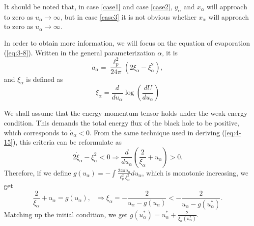 \documentclass[letterpaper,12pt]{article}
\begin{document}
It should be noted that, in case \ref{case1} and case \ref{case2}, $y_{\alpha}$ and $x_{\alpha}$ will approach to zero as $u_{\alpha} \rightarrow \infty$, but in case \ref{case3} it is not obvious whether $x_{\alpha}$ will approach to zero as $u_{\alpha} \rightarrow \infty$. 

In order to obtain more information, we will focus on the equation of evaporation (\ref{eq:3-8}). Written in the general parameterization $\alpha$, it is
\begin{equation}\label{eq:4-16}
\dot{a}_{\alpha} = \frac{\ell_{p}^{2}}{24\pi}(2\dot{\xi}_{\alpha}-\xi_{\alpha}^{2}),
\end{equation}
and $\xi_{\alpha}$ is defined as 
\begin{equation}\label{eq:4-18}
\xi_{\alpha} = \frac{d}{du_{\alpha}}\log\left(\frac{dU}{du_{\alpha}}\right)  
\end{equation}

We shall assume that the energy momentum tensor holds under the weak energy condition. This demands the total energy flux of the black hole to be positive, which corresponds to $\dot{a}_{\alpha} < 0$. From the same technique used in deriving (\ref{eq:4-15}), this criteria can be reformulate as 
\begin{equation}
2\dot{\xi}_{\alpha}-\xi_{\alpha}^{2} < 0 \Rightarrow \frac{d}{du_{\alpha}}\left( \frac{2}{\xi_{\alpha}} + u_{\alpha} \right) > 0.
\end{equation}
Therefore, if we define $g(u_{\alpha}) = -\int \frac{ 24\pi\dot{a}_{\alpha}}{\ell_{p}^{2}\xi_{\alpha}^{2}} du_{\alpha}$, which is monotonic increasing, we get
\begin{equation}
\frac{2}{\xi_{\alpha}} + u_{\alpha} = g(u_{\alpha}), \textrm{ }\Rightarrow \xi_{\alpha} = -\frac{2}{u_{\alpha}- g(u_{\alpha})} < -\frac{2}{u_{\alpha}-g(u_{\alpha}^{*})}.
\end{equation}
Matching up the initial condition, we get $g(u_{\alpha}^{*}) = u_{\alpha}^{*}+\frac{2}{\xi_{\alpha}(u_{\alpha}^{*})}$. 
\end{document}
